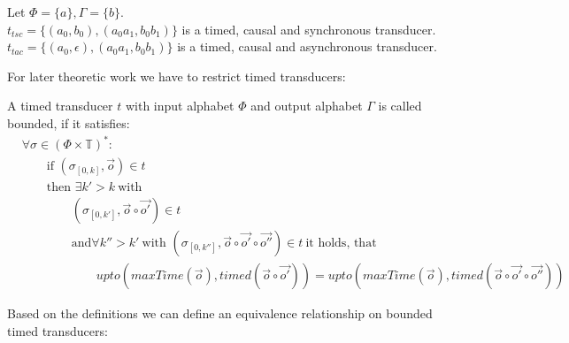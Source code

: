 \begin{exmp}[name=Timed Transducers]
  Let \(\Phi = \{a\}, \Gamma = \{b\}\).\\
  \(t_{tsc} = \{(a_0, b_0),(a_0a_1, b_0b_1)\}\) is a timed, causal and synchronous transducer.\\
  \(t_{tac} = \{(a_0, \epsilon),(a_0a_1, b_0b_1)\}\) is a timed, causal and asynchronous transducer.
\end{exmp}


For later theoretic work we have to restrict timed transducers:

\begin{definition}[name = Boundedness of Timed Transducers]\label{def:boundedness_timed_transducer}
  A timed transducer \(t\) with input alphabet \(\Phi\) and output alphabet \(\Gamma\) is called bounded, if it satisfies:
  \begin{align*}
    &\forall \sigma \in {(\Phi \times \mathbb{T})}^*:\\
    &\hspace{2em}\text{if } (\sigma_{[0,k]}, \vec{o}) \in t\\
    &\hspace{2em}\text{then }\exists k' > k\ \text{with}\\
    &\hspace{4em}(\sigma_{[0,k']}, \vec{o} \circ \vec{o'}) \in t\\
    &\hspace{4em}\text{and} \forall k'' > k'\ \text{with } (\sigma_{[0,k'']}, \vec{o}\circ\vec{o'}\circ\vec{o''}) \in t\ \text{it holds, that}\\
    &\hspace{6em}\mathit{upto}(\mathit{maxTime}(\vec{o}), \mathit{timed}(\vec{o}\circ\vec{o'})) = \mathit{upto}(\mathit{maxTime}(\vec{o}), \mathit{timed}(\vec{o}\circ\vec{o'}\circ\vec{o''}))
  \end{align*}
\end{definition}

Based on the definitions we can define an equivalence relationship on bounded timed transducers:

